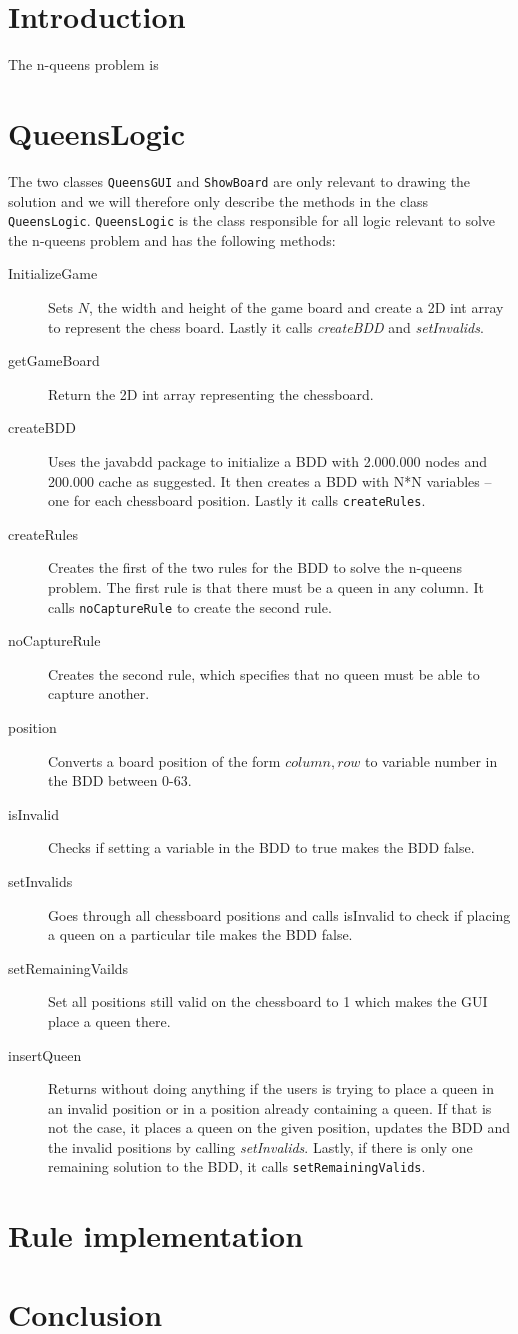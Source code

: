 \section{Introduction}
The n-queens problem is 
\section{QueensLogic}
The two classes \texttt{QueensGUI} and \texttt{ShowBoard} are only relevant to drawing the solution and we will therefore only describe the methods in the class \texttt{QueensLogic}. \texttt{QueensLogic} is the class responsible for all logic relevant to solve the n-queens problem and has the following methods:
\begin{description}
	\item[InitializeGame] Sets $N$, the width and height of the game board and create a 2D int array to represent the chess board. Lastly it calls \textit{createBDD} and \textit{setInvalids}.
	\item[getGameBoard] Return the 2D int array representing the chessboard.
	\item[createBDD] Uses the javabdd package to initialize a BDD with 2.000.000 nodes and 200.000 cache as suggested. It then creates a BDD with N*N variables -- one for each chessboard position. Lastly it calls \texttt{createRules}.
	\item[createRules] Creates the first of the two rules for the BDD to solve the n-queens problem. The first rule is that there must be a queen in any column. It calls \texttt{noCaptureRule} to create the second rule.
	\item[noCaptureRule] Creates the second rule, which specifies that no queen must be able to capture another.
	\item[position] Converts a board position of the form $column, row$ to variable number in the BDD between 0-63.	
	\item[isInvalid] Checks if setting a variable in the BDD to true makes the BDD false. 
	\item[setInvalids] Goes through all chessboard positions and calls isInvalid to check if placing a queen on a particular tile makes the BDD false.
	\item[setRemainingVailds] Set all positions still valid on the chessboard to 1 which makes the GUI place a queen there.
	\item[insertQueen] Returns without doing anything if the users is trying to place a queen in an invalid position or in a position already containing a queen. If that is not the case, it places a queen on the given position, updates the BDD and the invalid positions by calling \textit{setInvalids}. Lastly, if there is only one remaining solution to the BDD, it calls \texttt{setRemainingValids}.
\end{description}

\section{Rule implementation}

\section{Conclusion}